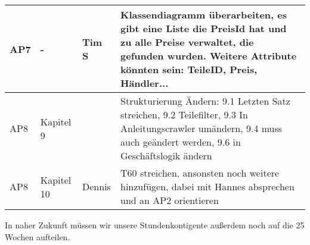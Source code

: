 \begin{flushleft}
\begin{longtable}{p{3cm}p{2cm}p{2cm}p{10cm}}
		AP7 & - & Tim S &  Klassendiagramm überarbeiten, es gibt eine Liste die PreisId hat und zu alle Preise verwaltet, die gefunden wurden. Weitere Attribute könnten sein: TeileID, Preis, Händler...\\ \midrule
		AP8 & Kapitel 9 &  & Strukturierung Ändern: 9.1 Letzten Satz streichen, 9.2 Teilefilter, 9.3 In Anleitungscrawler umändern, 9.4 muss auch geändert werden, 9.6 in Geschäftslogik ändern \\ \midrule
		AP8 & Kapitel 10 & Dennis &  T60 streichen, ansonsten noch weitere hinzufügen, dabei mit Hannes absprechen und an AP2 orientieren \\ 
		\bottomrule
	\end{longtable}
\end{flushleft}
In naher Zukunft müssen wir unsere Stundenkontigente außerdem noch auf die 25 Wochen aufteilen. 